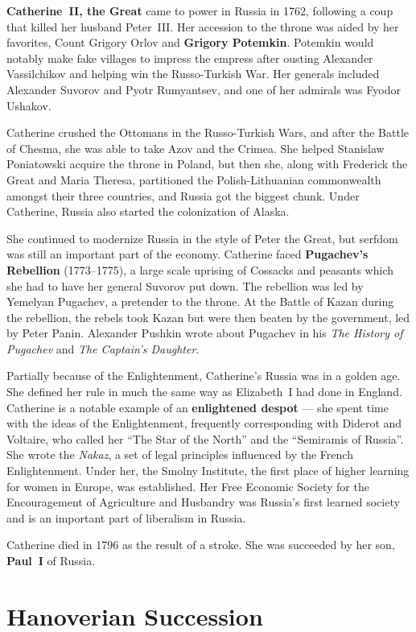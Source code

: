\textbf{Catherine~II, the Great} came to power in Russia in 1762,
following a coup that killed her husband Peter~III\@.
Her accession to the throne was aided by her favorites,
Count Grigory Orlov and \textbf{Grigory Potemkin}.
Potemkin would notably make fake villages to impress the empress
after ousting Alexander Vassilchikov and helping win the Russo-Turkish War.
Her generals included Alexander Suvorov and Pyotr Rumyantsev, and one of her admirals was Fyodor Ushakov.

Catherine crushed the Ottomans in the Russo-Turkish Wars,
and after the Battle of Chesma, she was able to take Azov and the Crimea.
She helped Stanislaw Poniatowski acquire the throne in Poland,
but then she, along with Frederick the Great and Maria Theresa,
partitioned the Polish-Lithuanian commonwealth amongst their three countries,
and Russia got the biggest chunk.
Under Catherine, Russia also started the colonization of Alaska.

She continued to modernize Russia in the style of Peter the Great,
but serfdom was still an important part of the economy.
Catherine faced \textbf{Pugachev's Rebellion} (1773--1775),
a large scale uprising of Cossacks and peasants which she had to have her general Suvorov put down.
The rebellion was led by Yemelyan Pugachev, a pretender to the throne.
At the Battle of Kazan during the rebellion,
the rebels took Kazan but were then beaten by the government, led by Peter Panin.
Alexander Pushkin wrote about Pugachev in his
\textit{The History of Pugachev} and \textit{The Captain's Daughter}.

Partially because of the Enlightenment, Catherine's Russia was in a golden age.
She defined her rule in much the same way as Elizabeth~I had done in England.
Catherine is a notable example of an \textbf{enlightened despot} ---
she spent time with the ideas of the Enlightenment, frequently corresponding with Diderot and Voltaire,
who called her ``The Star of the North'' and the ``Semiramis of Russia''.
She wrote the \textit{Nakaz}, a set of legal principles influenced by the French Enlightenment.
Under her, the Smolny Institute, the first place of higher learning for women in Europe, was established.
Her Free Economic Society for the Encouragement of Agriculture and Husbandry
was Russia's first learned society and is an important part of liberalism in Russia.

Catherine died in 1796 as the result of a stroke.
She was succeeded by her son, \textbf{Paul~I} of Russia.

\section{Hanoverian Succession}

